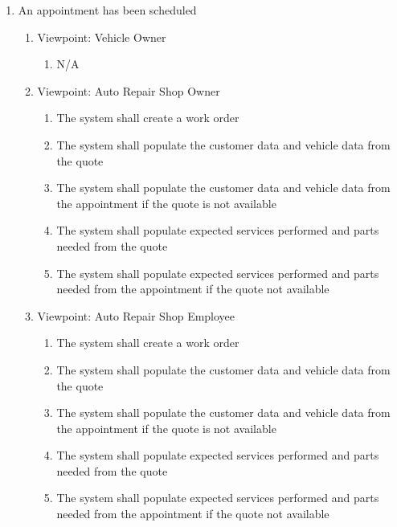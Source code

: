 \documentclass[12pt]{article}
\begin{document}
\begin{enumerate}[resume*=business_events]
	\item An appointment has been scheduled
	      \begin{enumerate}[VP\arabic*.]
		      \item Viewpoint: Vehicle Owner
		            \begin{enumerate}
			            \item[] N/A
		            \end{enumerate}
		      \item Viewpoint: Auto Repair Shop Owner
		            \begin{enumerate}
			            \item The system shall create a work order
			            \item The system shall populate the customer data and vehicle data from the quote
			            \item The system shall populate the customer data and vehicle data from the appointment if the quote is
			                  not available
			            \item The system shall populate expected services performed and parts needed from the quote
			            \item The system shall populate expected services performed and parts needed from the appointment if the
			                  quote not available
		            \end{enumerate}
		      \item Viewpoint: Auto Repair Shop Employee
		            \begin{enumerate}
			            \item The system shall create a work order
			            \item The system shall populate the customer data and vehicle data from the quote
			            \item The system shall populate the customer data and vehicle data from the appointment if the quote is
			                  not available
			            \item The system shall populate expected services performed and parts needed from the quote
			            \item The system shall populate expected services performed and parts needed from the appointment if the
			                  quote not available
		            \end{enumerate}
	      \end{enumerate}


\end{enumerate}
\end{document}
